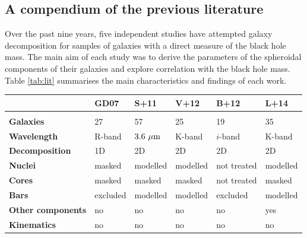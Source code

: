 \subsection{A compendium of the previous literature }
Over the past nine years, five independent studies 
\citep{grahamdriver2007,sani2011,vika2012,beifiori2012,lasker2014data,lasker2014anal}
have attempted galaxy decomposition 
for samples of galaxies with a direct measure of the black hole mass. 
The main aim of each study was to derive the parameters of the spheroidal components of their galaxies 
and explore correlation with the black hole mass.
Table \ref{tab:lit} summarises the main characteristics and findings of each work. 

\begin{table}[ht] 
\footnotesize
\centering 
\begin{tabular}{llllll}
\hline\hline 
		       & {\bf GD07}	 & {\bf S+11}	   & {\bf V+12} & {\bf B+12}  & {\bf L+14} \\ 	      %
\hline \\ [-1.5ex]
{\bf Galaxies }        & 27		 & 57		   & 25 	& 19	      & 35	   \\	      %
{\bf Wavelength }      & R-band 	 & $3.6~\mu \rm m$ & K-band	& $i$-band    & K-band     \\	      %
{\bf Decomposition}    & 1D		 & 2D		   & 2D 	& 2D	      & 2D	   \\	      %
{\bf Nuclei }	       & masked 	 & modelled	   & modelled	& not treated & modelled    \\	      %
{\bf Cores }	       & masked 	 & masked	   & masked	& not treated & masked     \\ 	      %
{\bf Bars }	       & excluded	 & modelled	   & modelled	& excluded    & modelled    \\ 	      %
{\bf Other components} & no		 & no		   & no 	& no	      & yes	   \\ 	      %
{\bf Kinematics}       & no		 & no		   & no 	& no	      & no	   \\ [0.5ex] %

\end{tabular}
\end{table}
